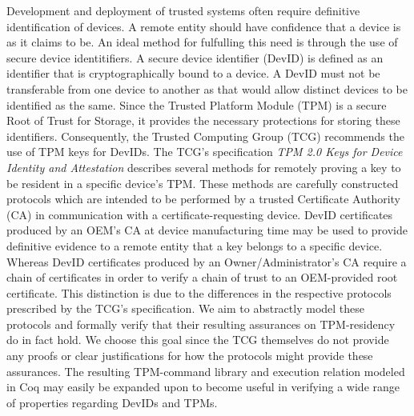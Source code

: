 \begin{abstractlong}

Development and deployment of trusted systems often require definitive identification of devices. A remote entity should have confidence that a device is as it claims to be. An ideal method for fulfulling this need is through the use of secure device identitifiers. A secure device identifier (DevID) is defined as an identifier that is cryptographically bound to a device. A DevID must not be transferable from one device to another as that would allow distinct devices to be identified as the same. Since the Trusted Platform Module (TPM) is a secure Root of Trust for Storage, it provides the necessary protections for storing these identifiers. Consequently, the Trusted Computing Group (TCG) recommends the use of TPM keys for DevIDs. 
The TCG's specification \textit{TPM 2.0 Keys for Device Identity and Attestation} describes several methods for remotely proving a key to be resident in a specific device's TPM. These methods are carefully constructed protocols which are intended to be performed by a trusted Certificate Authority (CA) in communication with a certificate-requesting device. DevID certificates produced by an OEM's CA at device manufacturing time may be used to provide definitive evidence to a remote entity that a key belongs to a specific device. Whereas DevID certificates produced by an Owner/Administrator's CA require a chain of certificates in order to verify a chain of trust to an OEM-provided root certificate. This distinction is due to the differences in the respective protocols prescribed by the TCG's specification. We aim to abstractly model these protocols and formally verify that their resulting assurances on TPM-residency do in fact hold. We choose this goal since the TCG themselves do not provide any proofs or clear justifications for how the protocols might provide these assurances. The resulting TPM-command library and execution relation modeled in Coq may easily be expanded upon to become useful in verifying a wide range of properties regarding DevIDs and TPMs.

\end{abstractlong}




\begin{acknowledgementslong}

\end{acknowledgementslong}

